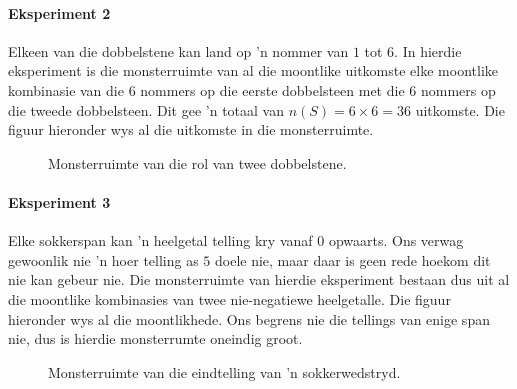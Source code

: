 \paragraph{Eksperiment 2} Elkeen van die dobbelstene kan land op 'n nommer van $1$ tot $6$. In hierdie eksperiment is die monsterruimte van al die moontlike uitkomste elke moontlike kombinasie van die $6$ nommers op die eerste dobbelsteen met die $6$ nommers op die tweede dobbelsteen. Dit gee 'n totaal van \(n(S) = 6 \times 6
= 36\) uitkomste. Die figuur hieronder wys al die uitkomste in die monsterruimte.

\begin{figure}[h]
\begin{center}
\end{center}
  \caption{Monsterruimte van die rol van twee dobbelstene.}
\end{figure}

\paragraph{Eksperiment 3} Elke sokkerspan kan 'n heelgetal telling kry vanaf $0$ opwaarts. Ons verwag gewoonlik nie 'n hoer telling as $5$ doele nie, maar daar is geen rede hoekom dit nie kan gebeur nie. Die monsterruimte van hierdie eksperiment bestaan dus uit al die moontlike kombinasies van twee nie-negatiewe heelgetalle. Die figuur hieronder wys al die moontlikhede. Ons begrens nie die tellings van enige span nie, dus is hierdie monsterrumte oneindig groot.

\begin{figure}[h]
\begin{center}
\end{center}
  \caption{Monsterruimte van die eindtelling van 'n sokkerwedstryd.}
\end{figure}


